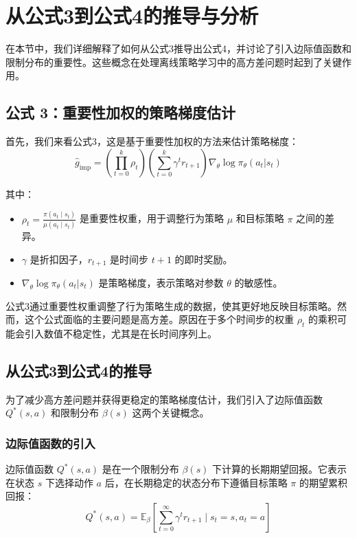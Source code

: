 \documentclass[twocolumn, 10pt]{article} %
\theoremstyle{remark}
\begin{document}
\section{从公式3到公式4的推导与分析}

在本节中，我们详细解释了如何从公式3推导出公式4，并讨论了引入边际值函数和限制分布的重要性。这些概念在处理离线策略学习中的高方差问题时起到了关键作用。

\subsection{公式 3：重要性加权的策略梯度估计}

首先，我们来看公式3，这是基于重要性加权的方法来估计策略梯度：
\[
\hat{g}_{\text{imp}} = \left( \prod_{t=0}^{k} \rho_t \right) \left( \sum_{t=0}^{k} \gamma^t r_{t+1} \right) \nabla_\theta \log \pi_\theta(a_t | s_t)
\]

其中：
\begin{itemize}
    \item \( \rho_t = \frac{\pi(a_t \mid s_t)}{\mu(a_t \mid s_t)} \) 是重要性权重，用于调整行为策略 \( \mu \) 和目标策略 \( \pi \) 之间的差异。
    \item \( \gamma \) 是折扣因子，\( r_{t+1} \) 是时间步 \( t+1 \) 的即时奖励。
    \item \( \nabla_\theta \log \pi_\theta(a_t | s_t) \) 是策略梯度，表示策略对参数 \( \theta \) 的敏感性。
\end{itemize}

公式3通过重要性权重调整了行为策略生成的数据，使其更好地反映目标策略。然而，这个公式面临的主要问题是高方差。原因在于多个时间步的权重 \( \rho_t \) 的乘积可能会引入数值不稳定性，尤其是在长时间序列上。

\subsection{从公式3到公式4的推导}

为了减少高方差问题并获得更稳定的策略梯度估计，我们引入了边际值函数 \( Q^*(s, a) \) 和限制分布 \( \beta(s) \) 这两个关键概念。

\subsubsection{边际值函数的引入}

边际值函数 \( Q^*(s, a) \) 是在一个限制分布 \( \beta(s) \) 下计算的长期期望回报。它表示在状态 \( s \) 下选择动作 \( a \) 后，在长期稳定的状态分布下遵循目标策略 \( \pi \) 的期望累积回报：
\[
Q^*(s, a) = \mathbb{E}_{\beta} \left[ \sum_{t=0}^{\infty} \gamma^t r_{t+1} \mid s_t = s, a_t = a \right]
\]
\end{document}
